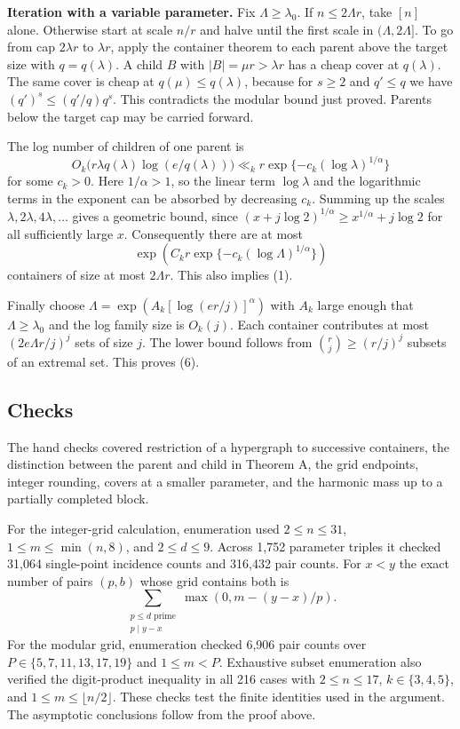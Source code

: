 \documentclass[10pt]{article}
\begin{document}
\textbf{Iteration with a variable parameter.} Fix \(\Lambda\ge\lambda_0\). If \(n\le 2\Lambda r\), take \([n]\) alone. Otherwise start at scale \(n/r\) and halve until the first scale in \((\Lambda,2\Lambda]\). To go from cap \(2\lambda r\) to \(\lambda r\), apply the container theorem to each parent above the target size with \(q=q(\lambda)\). A child \(B\) with \(|B|=\mu r>\lambda r\) has a cheap cover at \(q(\lambda)\). The same cover is cheap at \(q(\mu)\le q(\lambda)\), because for \(s\ge2\) and \(q'\le q\) we have \((q')^s\le(q'/q)q^s\). This contradicts the modular bound just proved. Parents below the target cap may be carried forward.

The log number of children of one parent is \[
O_k\big(r\lambda q(\lambda)\log(e/q(\lambda))\big)
\ll_k r\exp\{-c_k(\log\lambda)^{1/\alpha}\}
\] for some \(c_k>0\). Here \(1/\alpha>1\), so the linear term \(\log\lambda\) and the logarithmic terms in the exponent can be absorbed by decreasing \(c_k\). Summing up the scales \(\lambda,2\lambda,4\lambda,\ldots\) gives a geometric bound, since \((x+j\log2)^{1/\alpha}\ge x^{1/\alpha}+j\log 2\) for all sufficiently large \(x\). Consequently there are at most \[
\exp\!\left(C_k r\exp\{-c_k(\log\Lambda)^{1/\alpha}\}\right)
\] containers of size at most \(2\Lambda r\). This also implies (1).

Finally choose \(\Lambda=\exp(A_k[\log(e r/j)]^\alpha)\) with \(A_k\) large enough that \(\Lambda\ge\lambda_0\) and the log family size is \(O_k(j)\). Each container contributes at most \((2e\Lambda r/j)^j\) sets of size \(j\). The lower bound follows from \(\binom{r}{j}\ge(r/j)^j\) subsets of an extremal set. This proves (6).

\subsection{Checks}\label{checks}

The hand checks covered restriction of a hypergraph to successive containers, the distinction between the parent and child in Theorem A, the grid endpoints, integer rounding, covers at a smaller parameter, and the harmonic mass up to a partially completed block.

For the integer-grid calculation, enumeration used \(2\le n\le31\), \(1\le m\le\min(n,8)\), and \(2\le d\le9\). Across 1,752 parameter triples it checked 31,064 single-point incidence counts and 316,432 pair counts. For \(x<y\) the exact number of pairs \((p,b)\) whose grid contains both is \[
\sum_{\substack{p\le d\text{ prime}\\p\mid y-x}}
\max(0,m-(y-x)/p).
\] For the modular grid, enumeration checked 6,906 pair counts over \(P\in\{5,7,11,13,17,19\}\) and \(1\le m<P\). Exhaustive subset enumeration also verified the digit-product inequality in all 216 cases with \(2\le n\le17\), \(k\in\{3,4,5\}\), and \(1\le m\le\lfloor n/2\rfloor\). These checks test the finite identities used in the argument. The asymptotic conclusions follow from the proof above.
\end{document}
